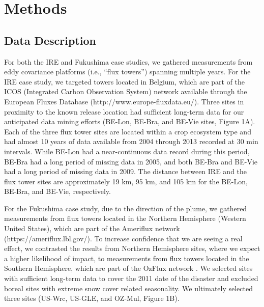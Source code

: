 \documentclass{article}
\begin{document}
\section{Methods}

\subsection{Data Description}

For both the IRE and Fukushima case studies, we gathered measurements from eddy covariance platforms (i.e., “flux towers”) spanning multiple years. For the IRE case study, we targeted towers located in Belgium, which are part of the ICOS (Integrated Carbon Observation System) network available through the European Fluxes Database (http://www.europe-fluxdata.eu/). Three sites in proximity to the known release location had sufficient long-term data for our anticipated data mining efforts (BE-Lon, BE-Bra, and BE-Vie sites, Figure 1A). Each of the three flux tower sites are located within a crop ecosystem type and had almost 10 years of data available from 2004 through 2013 recorded at 30 min intervals. While BE-Lon had a near-continuous data record during this period, BE-Bra had a long period of missing data in 2005, and both BE-Bra and BE-Vie had a long period of missing data in 2009. The distance between IRE and the flux tower sites are approximately 19 km, 95 km, and 105 km for the BE-Lon, BE-Bra, and BE-Vie, respectively.

For the Fukushima case study, due to the direction of the plume, we gathered measurements from flux towers located in the Northern Hemisphere (Western United States), which are part of the Ameriflux network (https://ameriflux.lbl.gov/). To increase confidence that we are seeing a real effect, we contrasted the results from Northern Hemisphere sites, where we expect a higher likelihood of impact, to measurements from flux towers located in the Southern Hemisphere, which are part of the OzFlux network \citep{cleverly2011alice}. We selected sites with sufficient long-term data to cover the 2011 date of the disaster and excluded boreal sites with extreme snow cover related seasonality. We ultimately selected three sites (US-Wrc, US-GLE, and OZ-Mul, Figure 1B).
\end{document}
